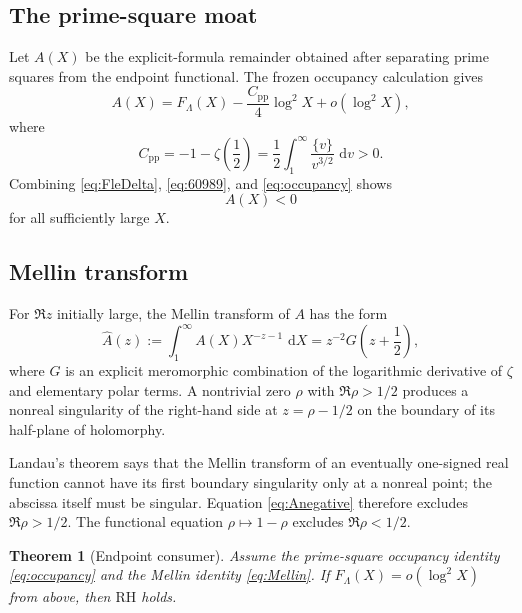\documentclass[11pt]{article}
\newtheorem{theorem}{Theorem}[section]
\theoremstyle{definition}
\theoremstyle{remark}
\newcommand{\RH}{\mathrm{RH}}
\newcommand{\1}{\mathbf 1}
\newcommand{\dd}{\,\mathrm d}
\begin{document}
\subsection{The prime-square moat}

Let \(A(X)\) be the explicit-formula remainder obtained after separating prime squares from the endpoint functional.  The frozen occupancy calculation gives
\begin{equation}\label{eq:occupancy}
A(X)=F_\Lambda(X)-\frac{C_{\mathrm{pp}}}{4}\log^2X+o(\log^2X),
\end{equation}
where
\begin{equation}\label{eq:Cpp}
C_{\mathrm{pp}}=-1-\zeta\!\left(\frac12\right)
=\frac12\int_1^\infty \frac{\{v\}}{v^{3/2}}\,\dd v>0.
\end{equation}
Combining \eqref{eq:FleDelta}, \eqref{eq:60989}, and \eqref{eq:occupancy} shows
\begin{equation}\label{eq:Anegative}
A(X)<0
\end{equation}
for all sufficiently large \(X\).

\subsection{Mellin transform}

For \(\Re z\) initially large, the Mellin transform of \(A\) has the form
\begin{equation}\label{eq:Mellin}
\widehat A(z):=\int_1^\infty A(X)X^{-z-1}\,\dd X
=z^{-2}G\!\left(z+\frac12\right),
\end{equation}
where \(G\) is an explicit meromorphic combination of the logarithmic derivative of \(\zeta\) and elementary polar terms.  A nontrivial zero \(\rho\) with \(\Re\rho>1/2\) produces a nonreal singularity of the right-hand side at \(z=\rho-1/2\) on the boundary of its half-plane of holomorphy.

Landau's theorem says that the Mellin transform of an eventually one-signed real function cannot have its first boundary singularity only at a nonreal point; the abscissa itself must be singular.  Equation \eqref{eq:Anegative} therefore excludes \(\Re\rho>1/2\).  The functional equation \(\rho\mapsto1-\rho\) excludes \(\Re\rho<1/2\).

\begin{theorem}[Endpoint consumer]\label{thm:endpoint-consumer}
Assume the prime-square occupancy identity \eqref{eq:occupancy} and the Mellin identity \eqref{eq:Mellin}.  If \(F_\Lambda(X)=o(\log^2X)\) from above, then \(\RH\) holds.
\end{theorem}
\end{document}
